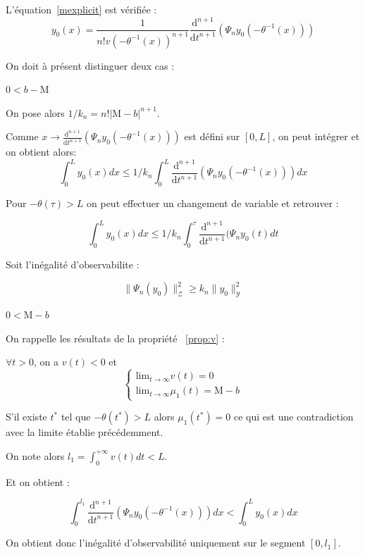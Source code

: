 \documentclass[a4paper]{article}
\newcommand{\mass}{\mathrm{M}}
\newcommand{\dep}{b}
\begin{document}
\begin{preuve}
	L'équation~\eqref{mexplicit} est vérifiée :
	\[y_0(x) = \frac{1}{n! v(-\theta^{-1}(x))^{n+1}} \frac{\mathrm{d}^{n+1}}{\mathrm{d}t^{n+1}} (\Psi_ny_0(-\theta^{-1}(x)))\]
	
	On doit à présent distinguer deux cas :
	
	\vspace{0.3cm}
	\underline{$0<\dep-\mass $}
	
	On pose alors $ 1/k_n = n! |\mass - \dep|^{n+1} $.
	
	Comme $x \to \frac{\mathrm{d}^{n+1}}{\mathrm{d}t^{n+1}} (\Psi_ny_0(-\theta^{-1}(x))) $ est défini sur $[0,L]$, on peut intégrer et on obtient 
	alors:
	\[ 
		\int_0^Ly_0(x)dx \leq 1/k_n \int_0^L \frac{\mathrm{d}^{n+1}}{\mathrm{d}t^{n+1}} (\Psi_ny_0(-\theta^{-1}(x))) dx
		\]

		
	Pour $ -\theta(\tau) > L$ on peut effectuer un changement de variable et retrouver :
	
	\[ \int_0^Ly_0(x)dx \leq 1/k_n \int_0^\tau \frac{\mathrm{d}^{n+1}}{\mathrm{d}t^{n+1}} (\Psi_ny_0(t) dt \]
	
	Soit l'inégalité d'observabilite :
	
	\[\| \Psi_n(y_0)\|_{\mathscr{Z}}^2 \geq k_n \|y_0\|^2_{\mathscr{Y}}\]
	
	
	\underline{$0<\mass-\dep$}
	
	On rappelle les résultats de la propriété ~\ref{prop:v} :
	
	$\forall t>0 $, on a $v(t)<0$ et 
	\[
	\begin{cases}
		\mathrm{lim}_{t \rightarrow \infty} v(t) = 0 \\
		\mathrm{lim}_{t \rightarrow \infty} \mu_1(t)= \mass -\dep 
	\end{cases}
	\]
	
	S'il existe $t^*$ tel que $- \theta(t^*)>L$ alors $\mu_1(t^*) =0$ 
	ce qui est une contradiction avec la limite établie précédemment.
	
	On note alors $l_1 = \int_0^{+\infty} v(t)dt < L $.
	
	Et on obtient :
	
	\[ 
\int_0^{l_1} \frac{\mathrm{d}^{n+1}}{\mathrm{d}t^{n+1}} (\Psi_ny_0(-\theta^{-1}(x))) dx
 < \int_0^L y_0(x)dx
		\]
	
	On obtient donc l'inégalité d'observabilité uniquement sur le segment $[0,l_1]$.
	
	
	
\end{preuve}
\end{document}
